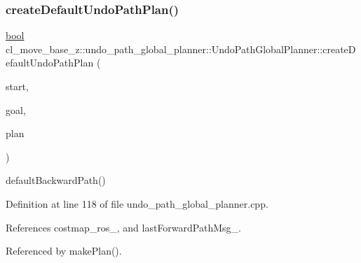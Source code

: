 \subsubsection{\texorpdfstring{create\+Default\+Undo\+Path\+Plan()}{createDefaultUndoPathPlan()}}
{\footnotesize\ttfamily \hyperlink{classbool}{bool} cl\+\_\+move\+\_\+base\+\_\+z\+::undo\+\_\+path\+\_\+global\+\_\+planner\+::\+Undo\+Path\+Global\+Planner\+::create\+Default\+Undo\+Path\+Plan (\begin{DoxyParamCaption}\item[{const geometry\+\_\+msgs\+::\+Pose\+Stamped \&}]{start,  }\item[{const geometry\+\_\+msgs\+::\+Pose\+Stamped \&}]{goal,  }\item[{std\+::vector$<$ geometry\+\_\+msgs\+::\+Pose\+Stamped $>$ \&}]{plan }\end{DoxyParamCaption})\hspace{0.3cm}{\ttfamily [virtual]}}

default\+Backward\+Path() 

Definition at line 118 of file undo\+\_\+path\+\_\+global\+\_\+planner.\+cpp.



References costmap\+\_\+ros\+\_\+, and last\+Forward\+Path\+Msg\+\_\+.



Referenced by make\+Plan().


